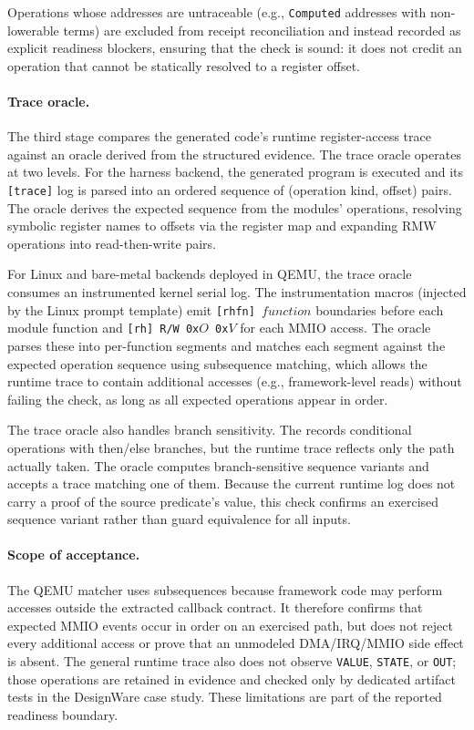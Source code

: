 Operations whose addresses are untraceable (e.g., \texttt{Computed} addresses
with non-lowerable terms) are excluded from receipt reconciliation and
instead recorded as explicit readiness blockers, ensuring that the check is
sound: it does not credit an operation that cannot be statically resolved to
a register offset.

\paragraph{Trace oracle.}

The third stage compares the generated code's runtime register-access trace
against an oracle derived from the structured \rislang{} evidence. The trace oracle
operates at two levels. For the harness backend, the generated program is
executed and its \texttt{[trace]} log is parsed into an ordered sequence of
(operation kind, offset) pairs. The oracle derives the expected sequence from
the \rislang{} modules' operations, resolving symbolic register names to
offsets via the register map and expanding RMW operations into read-then-write
pairs.

For Linux and bare-metal backends deployed in QEMU, the trace oracle consumes
an instrumented kernel serial log. The instrumentation macros (injected by
the Linux prompt template) emit \texttt{[rhfn]\,$function$} boundaries before
each module function and \texttt{[rh]\,R/W\,0x$O$\,0x$V$} for each MMIO access.
The oracle parses these into per-function segments and matches each segment
against the expected \rislang{} operation sequence using subsequence matching,
which allows the runtime trace to contain additional accesses (e.g.,
framework-level reads) without failing the check, as long as all expected
operations appear in order.

The trace oracle also handles branch sensitivity. The \rislang{} records
conditional operations with then/else branches, but the runtime trace reflects
only the path actually taken. The oracle computes branch-sensitive sequence
variants and accepts a trace matching one of them. Because the current runtime
log does not carry a proof of the source predicate's value, this check confirms
an exercised sequence variant rather than guard equivalence for all inputs.

\paragraph{Scope of acceptance.}
The QEMU matcher uses subsequences because framework code may perform accesses
outside the extracted callback contract. It therefore confirms that expected
MMIO events occur in order on an exercised path, but does not reject every
additional access or prove that an unmodeled DMA/IRQ/MMIO side effect is absent.
The general runtime trace also does not observe
\texttt{VALUE}, \texttt{STATE}, or \texttt{OUT}; those operations are retained
in evidence and checked only by dedicated artifact tests in the DesignWare
case study. These limitations are part of the reported readiness boundary.

